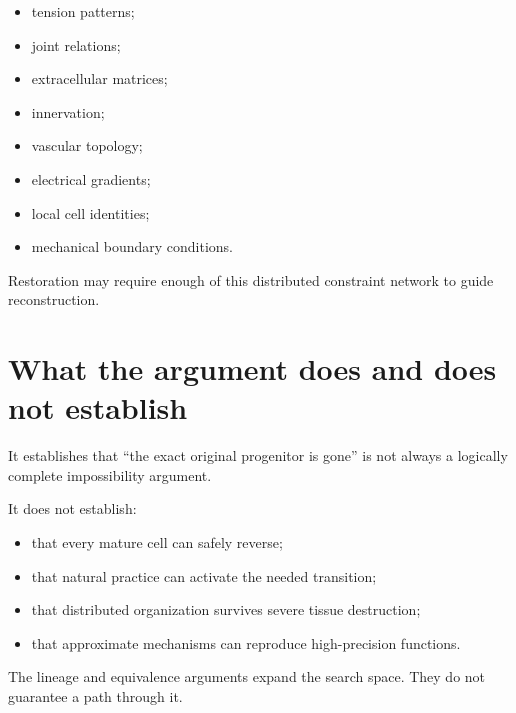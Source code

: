 \begin{itemize}
\tightlist
\item
  tension patterns;
\item
  joint relations;
\item
  extracellular matrices;
\item
  innervation;
\item
  vascular topology;
\item
  electrical gradients;
\item
  local cell identities;
\item
  mechanical boundary conditions.
\end{itemize}

Restoration may require enough of this distributed constraint network to guide reconstruction.

\section{What the argument does and does not establish}

It establishes that ``the exact original progenitor is gone'' is not always a logically complete impossibility argument.

It does not establish:

\begin{itemize}
\tightlist
\item
  that every mature cell can safely reverse;
\item
  that natural practice can activate the needed transition;
\item
  that distributed organization survives severe tissue destruction;
\item
  that approximate mechanisms can reproduce high-precision functions.
\end{itemize}

The lineage and equivalence arguments expand the search space. They do not guarantee a path through it.
